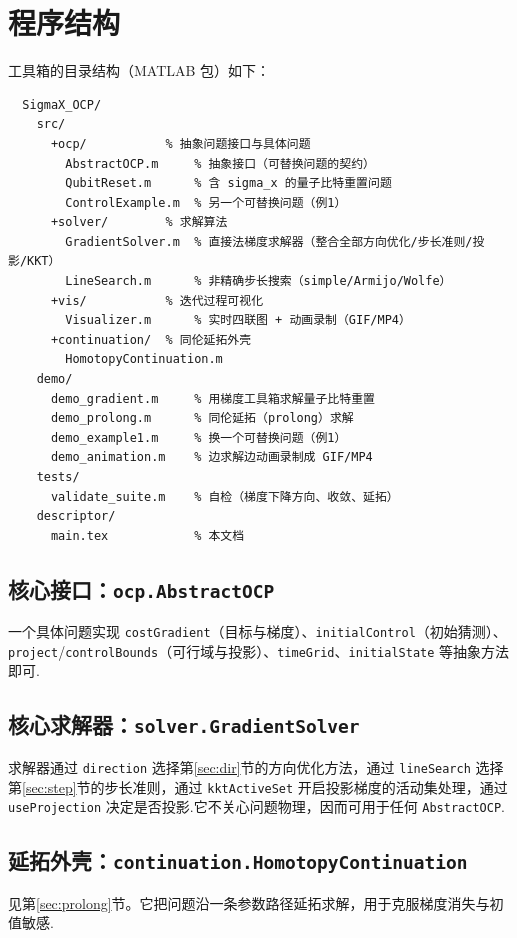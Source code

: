 \documentclass[UTF8]{article}
\numberwithin{equation}{section}
\begin{document}
    \section{程序结构}
        工具箱的目录结构（MATLAB 包）如下：
        \begin{lstlisting}
  SigmaX_OCP/
    src/
      +ocp/           % 抽象问题接口与具体问题
        AbstractOCP.m     % 抽象接口（可替换问题的契约）
        QubitReset.m      % 含 sigma_x 的量子比特重置问题
        ControlExample.m  % 另一个可替换问题（例1）
      +solver/        % 求解算法
        GradientSolver.m  % 直接法梯度求解器（整合全部方向优化/步长准则/投影/KKT）
        LineSearch.m      % 非精确步长搜索（simple/Armijo/Wolfe）
      +vis/           % 迭代过程可视化
        Visualizer.m      % 实时四联图 + 动画录制（GIF/MP4）
      +continuation/  % 同伦延拓外壳
        HomotopyContinuation.m
    demo/
      demo_gradient.m     % 用梯度工具箱求解量子比特重置
      demo_prolong.m      % 同伦延拓（prolong）求解
      demo_example1.m     % 换一个可替换问题（例1）
      demo_animation.m    % 边求解边动画录制成 GIF/MP4
    tests/
      validate_suite.m    % 自检（梯度下降方向、收敛、延拓）
    descriptor/
      main.tex            % 本文档
\end{lstlisting}
        \subsection{核心接口：\texttt{ocp.AbstractOCP}}
            一个具体问题实现 \texttt{costGradient}（目标与梯度）、\texttt{initialControl}（初始猜测）、\texttt{project}/\texttt{controlBounds}（可行域与投影）、\texttt{timeGrid}、\texttt{initialState} 等抽象方法即可.
        \subsection{核心求解器：\texttt{solver.GradientSolver}}
            求解器通过 \texttt{direction} 选择第\ref{sec:dir}节的方向优化方法，通过 \texttt{lineSearch} 选择第\ref{sec:step}节的步长准则，通过 \texttt{kktActiveSet} 开启投影梯度的活动集处理，通过 \texttt{useProjection} 决定是否投影.它不关心问题物理，因而可用于任何 \texttt{AbstractOCP}.
        \subsection{延拓外壳：\texttt{continuation.HomotopyContinuation}}
            见第\ref{sec:prolong}节。它把问题沿一条参数路径延拓求解，用于克服梯度消失与初值敏感.
\end{document}
